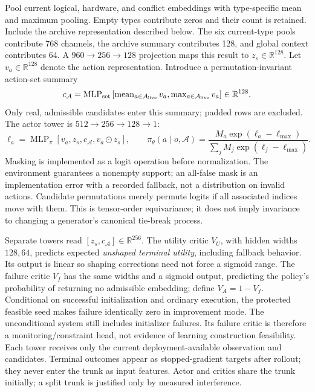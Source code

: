 \documentclass[11pt,a4paper]{article}
\theoremstyle{definition}\newtheorem{definition}[proposition]{Definition}
\begin{document}
Pool current logical, hardware, and conflict embeddings with type-specific mean and maximum pooling. Empty types contribute zeros and their count is retained. Include the archive representation described below. The six current-type pools contribute 768 channels, the archive summary contributes 128, and global context contributes 64. A \(960\to256\to128\) projection maps this result to \(z_s\in\mathbb R^{128}\). Let \(v_a\in\mathbb R^{128}\) denote the action representation. Introduce a permutation-invariant action-set summary
\[
 c_{\mathcal A}=\operatorname{MLP}_{\rm set}
 \left[\operatorname{mean}_{a\in\mathcal A_{\rm live}}v_a,
       \operatorname{max}_{a\in\mathcal A_{\rm live}}v_a\right]
 \in\mathbb R^{128}.
\]
Only real, admissible candidates enter this summary; padded rows are excluded. The actor tower is \(512\to256\to128\to1\):
\[
 \ell_a=\operatorname{MLP}_\pi
 [v_a,z_s,c_{\mathcal A},v_a\odot z_s],\qquad
 \pi_\theta(a\mid o,\mathcal A)=
 \frac{M_a\exp(\ell_a-\ell_{\max})}
 {\sum_j M_j\exp(\ell_j-\ell_{\max})}.
\]
Masking is implemented as a logit operation before normalization. The environment guarantees a nonempty support; an all-false mask is an implementation error with a recorded fallback, not a distribution on invalid actions. Candidate permutations merely permute logits if all associated indices move with them. This is tensor-order equivariance; it does not imply invariance to changing a generator's canonical tie-break process.

Separate towers read \([z_s,c_{\mathcal A}]\in\mathbb R^{256}\). The utility critic \(V_U\), with hidden widths \(128,64\), predicts expected \emph{unshaped terminal utility}, including fallback behavior. Its output is linear so shaping corrections need not force a sigmoid range. The failure critic \(V_f\) has the same widths and a sigmoid output, predicting the policy's probability of returning no admissible embedding; define \(V_A=1-V_f\). Conditional on successful initialization and ordinary execution, the protected feasible seed makes failure identically zero in improvement mode. The unconditional system still includes initializer failures. Its failure critic is therefore a monitoring/constraint head, not evidence of learning construction feasibility. Each tower receives only the current deployment-available observation and candidates. Terminal outcomes appear as stopped-gradient targets after rollout; they never enter the trunk as input features. Actor and critics share the trunk initially; a split trunk is justified only by measured interference.
\end{document}
